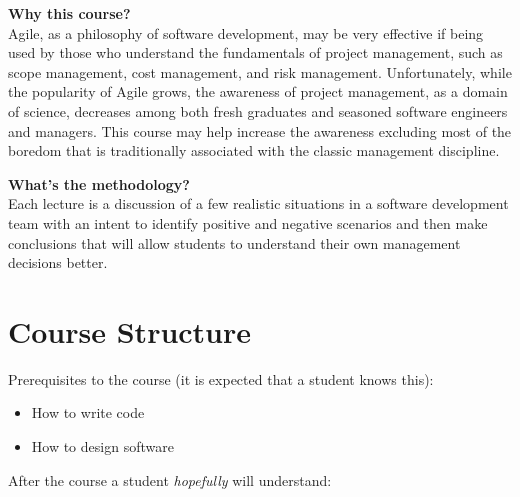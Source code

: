 \documentclass[nobrand,anonymous,nodate,nosecurity]{huawei}
\begin{document}
{\textbf{Why this course?}\\
Agile, as a philosophy of software development, may be very effective if being used
by those who understand the fundamentals of project management, such as scope management,
cost management, and risk management. Unfortunately, while the popularity of Agile
grows, the awareness of project management, as a domain of science, decreases among
both fresh graduates and seasoned software engineers and managers.
This course may help increase the awareness excluding most of the boredom that
is traditionally associated with the classic management discipline.

\textbf{What's the methodology?}\\
Each lecture is a discussion of a few realistic situations in a software development
team with an intent to identify positive and negative scenarios and then make
conclusions that will allow students to understand their own management decisions better.

\newpage
\section*{Course Structure}

Prerequisites to the course (it is expected that a student knows this):

\begin{itemize}
\item How to write code
\item How to design software
\end{itemize}

After the course a student \emph{hopefully} will understand:

}
\end{document}
